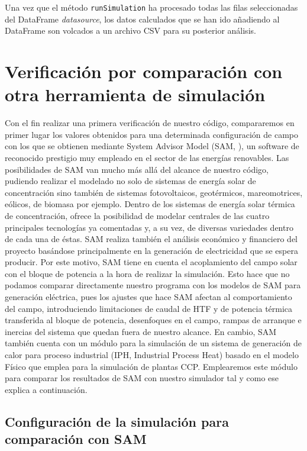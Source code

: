 Una vez que el método \texttt{runSimulation} ha procesado todas las filas seleccionadas del DataFrame \emph{datasource}, los datos calculados que se han ido añadiendo al DataFrame son volcados a un archivo CSV para su posterior análisis.

\section{Verificación por comparación con otra herramienta de simulación}

Con el fin realizar una primera verificación de nuestro código, compararemos en primer lugar los valores obtenidos para una determinada configuración de campo con los que se obtienen mediante System Advisor Model (SAM, \cite{freemanSystemAdvisorModel2018}), un software de reconocido prestigio muy empleado en el sector de las energías renovables. Las posibilidades de SAM van mucho más allá del alcance de nuestro código, pudiendo realizar el modelado no solo de sistemas de energía solar de concentración sino también de sistemas fotovoltaicos, geotérmicos, mareomotrices, eólicos, de biomasa por ejemplo. Dentro de los sistemas de energía solar térmica de concentración, ofrece la posibilidad de modelar centrales de las cuatro principales tecnologías ya comentadas y, a su vez, de diversas variedades dentro de cada una de éstas. SAM realiza también el análisis económico y financiero del proyecto basándose principalmente en la generación de electricidad que se espera producir. Por este motivo, SAM tiene en cuenta el acoplamiento del campo solar con el bloque de potencia a la hora de realizar la simulación.  Esto hace que no podamos comparar directamente nuestro programa con los modelos de SAM para generación eléctrica, pues los ajustes que hace SAM afectan al comportamiento del campo, introduciendo limitaciones de caudal de HTF y de potencia térmica transferida al bloque de potencia, desenfoques en el campo, rampas de arranque e inercias del sistema que quedan fuera de nuestro alcance. En cambio, SAM también cuenta con un módulo para la simulación de un sistema de generación de calor  para proceso industrial (IPH, Industrial Process Heat) basado en el modelo Físico que emplea para la simulación de plantas CCP. Emplearemos este módulo para comparar los resultados de SAM con nuestro simulador tal y como ese explica a continuación.

\subsection{Configuración de la simulación para comparación con SAM}
\label{configuracion-simulaciones}

